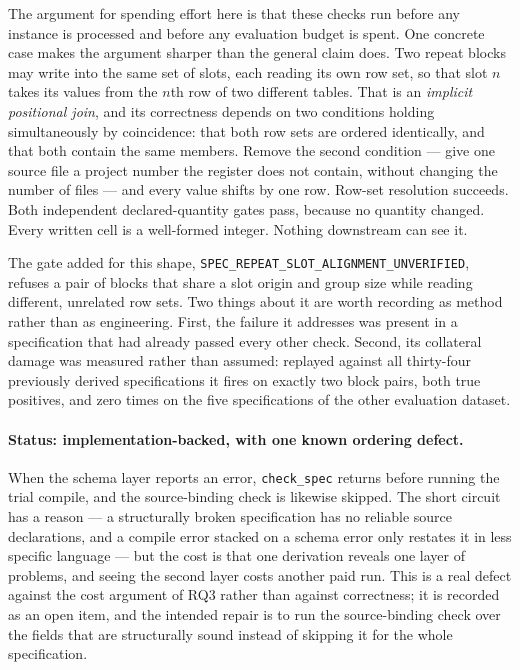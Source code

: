 The argument for spending effort here is that these checks run before any instance is processed
and before any evaluation budget is spent. One concrete case makes the argument sharper than the
general claim does. Two repeat blocks may write into the same set of slots, each reading its own
row set, so that slot $n$ takes its values from the $n$th row of two different tables. That is an
\emph{implicit positional join}, and its correctness depends on two conditions holding
simultaneously by coincidence: that both row sets are ordered identically, and that both contain
the same members. Remove the second condition --- give one source file a project number the
register does not contain, without changing the number of files --- and every value shifts by one
row. Row-set resolution succeeds. Both independent declared-quantity gates pass, because no
quantity changed. Every written cell is a well-formed integer. Nothing downstream can see it.

The gate added for this shape, \texttt{SPEC\_REPEAT\_SLOT\_ALIGNMENT\_UNVERIFIED}, refuses a pair
of blocks that share a slot origin and group size while reading different, unrelated row sets. Two
things about it are worth recording as method rather than as engineering. First, the failure it
addresses was present in a specification that had already passed every other check. Second, its
collateral damage was measured rather than assumed: replayed against all thirty-four previously
derived specifications it fires on exactly two block pairs, both true positives, and zero times on
the five specifications of the other evaluation dataset.

\paragraph{Status: implementation-backed, with one known ordering defect.}
When the schema layer reports an error, \texttt{check\_spec} returns before running the trial
compile, and the source-binding check is likewise skipped. The short circuit has a reason --- a
structurally broken specification has no reliable source declarations, and a compile error stacked
on a schema error only restates it in less specific language --- but the cost is that one
derivation reveals one layer of problems, and seeing the second layer costs another paid run. This
is a real defect against the cost argument of RQ3 rather than against correctness; it is recorded
as an open item, and the intended repair is to run the source-binding check over the fields that
are structurally sound instead of skipping it for the whole specification.

